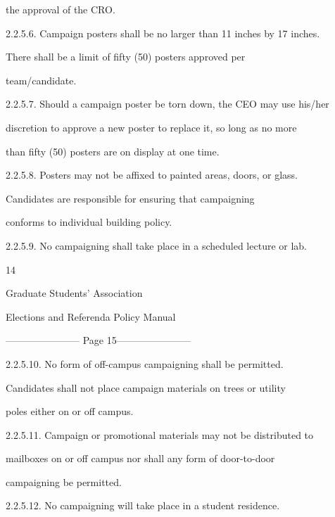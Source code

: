              the approval of the CRO.   

2.2.5.6.     Campaign posters shall be no larger than 11 inches by 17 inches.  

             There   shall   be   a   limit   of   fifty   (50)   posters   approved   per  

             team/candidate.   

2.2.5.7.     Should a campaign poster be torn down, the CEO may use his/her  

             discretion to approve a new poster to replace it, so long as no more  

             than fifty (50) posters are on display at one time.   

2.2.5.8.     Posters  may  not  be  affixed  to  painted  areas,  doors,  or  glass.  

             Candidates       are    responsible       for    ensuring      that    campaigning  

             conforms to individual building policy.   

2.2.5.9.     No campaigning shall take place in a scheduled lecture or lab.   



                                                   14  

                                                                                                       

                              Graduate Students’ Association  

                         Elections and Referenda Policy Manual  

  


----------------------- Page 15-----------------------

2.2.5.10. No        form     of    off-campus         campaigning         shall    be    permitted.  

             Candidates  shall  not  place  campaign  materials  on  trees  or  utility  

             poles either on or off campus.   

2.2.5.11.  Campaign  or  promotional  materials  may  not  be  distributed  to  

             mailboxes  on  or  off  campus  nor  shall  any  form  of  door-to-door  

             campaigning be permitted.   

2.2.5.12. No campaigning will take place in a student residence.   

